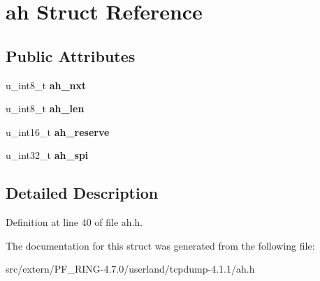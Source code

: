 \hypertarget{structah}{
\section{ah Struct Reference}
\label{structah}
}
\subsection*{Public Attributes}
\begin{DoxyCompactItemize}
\item 
\hypertarget{structah_ab80481b74d62a8e4b1f29a573536c801}{
u\_\-int8\_\-t {\bfseries ah\_\-nxt}}
\label{structah_ab80481b74d62a8e4b1f29a573536c801}

\item 
\hypertarget{structah_a2e66c82c8d5ddf60eb248fbf3b76d65a}{
u\_\-int8\_\-t {\bfseries ah\_\-len}}
\label{structah_a2e66c82c8d5ddf60eb248fbf3b76d65a}

\item 
\hypertarget{structah_a3222896be894fda52058466696086951}{
u\_\-int16\_\-t {\bfseries ah\_\-reserve}}
\label{structah_a3222896be894fda52058466696086951}

\item 
\hypertarget{structah_aefffa0057470adb5f097f90cd8696dac}{
u\_\-int32\_\-t {\bfseries ah\_\-spi}}
\label{structah_aefffa0057470adb5f097f90cd8696dac}

\end{DoxyCompactItemize}


\subsection{Detailed Description}


Definition at line 40 of file ah.h.



The documentation for this struct was generated from the following file:\begin{DoxyCompactItemize}
\item 
src/extern/PF\_\-RING-\/4.7.0/userland/tcpdump-\/4.1.1/ah.h\end{DoxyCompactItemize}
